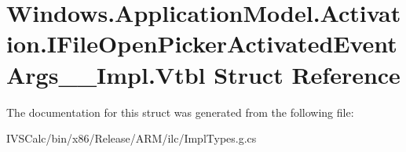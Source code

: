 \hypertarget{struct_windows_1_1_application_model_1_1_activation_1_1_i_file_open_picker_activated_event_args_____impl_1_1_vtbl}{}\section{Windows.\+Application\+Model.\+Activation.\+I\+File\+Open\+Picker\+Activated\+Event\+Args\+\_\+\+\_\+\+Impl.\+Vtbl Struct Reference}
\label{struct_windows_1_1_application_model_1_1_activation_1_1_i_file_open_picker_activated_event_args_____impl_1_1_vtbl}


The documentation for this struct was generated from the following file\+:\begin{DoxyCompactItemize}
\item 
I\+V\+S\+Calc/bin/x86/\+Release/\+A\+R\+M/ilc/Impl\+Types.\+g.\+cs\end{DoxyCompactItemize}
